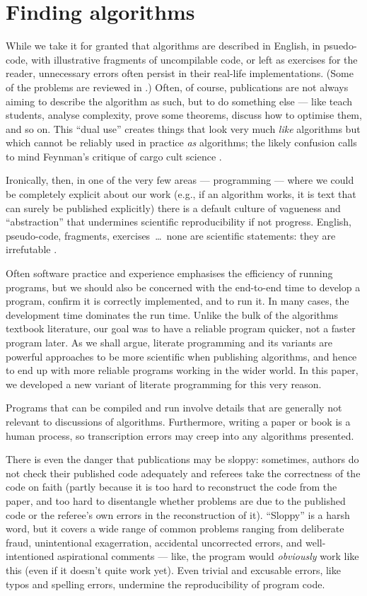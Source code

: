\documentclass[12pt]{article}
\begin{document}
\section{Finding algorithms}\label{new-approach}
While we take it for granted that algorithms are described in English, in psuedo-code, with illustrative fragments of uncompilable code, or left as exercises for the reader, unnecessary errors often persist in their real-life implementations. (Some of the problems are reviewed in \cite{heedless,jmlr}.) Often, of course, publications are not always aiming to describe the algorithm as such, but to do something else --- like teach students, analyse complexity, prove some theorems, discuss how to optimise them, and so on. This ``dual use'' creates things that look very much \emph{like\/} algorithms but which cannot be reliably used in practice \emph{as\/} algorithms; the likely confusion calls to mind Feynman's critique of cargo cult science \cite{feynman}. 

Ironically, then, in one of the very few areas --- programming --- where we could be completely explicit about our work (e.g., if an algorithm works, it is text that can surely be published explicitly) there is a default culture of vagueness and ``abstraction'' that undermines scientific reproducibility if not progress. English, pseudo-code, fragments, exercises~\ldots\ none are scientific statements: they are irrefutable \cite{popper}. 

Often software practice and experience emphasises the efficiency of running programs, but we should also be concerned with the end-to-end time to develop a program, confirm it is correctly implemented, and to run it. In many cases, the development time dominates the run time. Unlike the bulk of the algorithms textbook literature, our goal was to have a reliable program quicker, not a faster program later. As we shall argue, literate programming and its variants are powerful approaches to be more scientific when publishing algorithms, and hence to end up with more reliable programs working in the wider world. In this paper, we developed a new variant of literate programming for this very reason.

Programs that can be compiled and run involve details that are generally not relevant to discussions of algorithms. Furthermore, writing a paper or book is a human process, so transcription errors may creep into any algorithms presented. 

There is even the danger that publications may be sloppy: sometimes, authors do not check their published code adequately and referees take the correctness of the code on faith (partly because it is too hard to reconstruct the code from the paper, and too hard to disentangle whether problems are due to the published code or the referee's own errors in the reconstruction of it). ``Sloppy'' is a harsh word, but it covers a wide range of common problems ranging from deliberate fraud, unintentional exagerration, accidental uncorrected errors, and well-intentioned aspirational comments --- like, the program would \emph{obviously\/} work like this (even if it doesn't quite work yet). Even trivial and excusable errors, like typos and spelling errors, undermine the reproducibility of program code.
\end{document}
